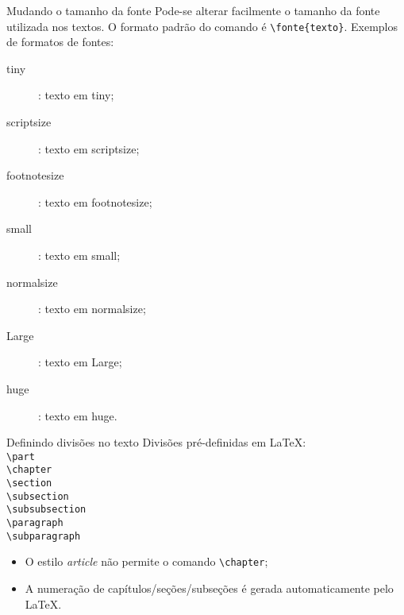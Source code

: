 \begin{frame}[fragile]{Mudando o tamanho da fonte}
Pode-se alterar facilmente o tamanho da fonte utilizada nos textos. O formato padr\~ao do comando \'e \verb|\fonte{texto}|. Exemplos de formatos de fontes:\\
\begin{description}
\item[tiny]: \tiny{texto em tiny};
\item[scriptsize]: \scriptsize{texto em scriptsize};
\item[footnotesize]: \footnotesize{texto em footnotesize}; 
\item[small]: \small{texto em small};
\item[normalsize]: \normalsize{texto em normalsize};
\item[Large]: \Large{texto em Large};
\item[huge]: \huge{texto em huge}.
\end{description}
\end{frame}


\begin{frame}[fragile]{Definindo divis\~oes no texto}
Divis\~oes pr\'e-definidas em \LaTeX:\\
\verb|\part| \\
\verb|\chapter| \\
\verb|\section| \\
\verb|\subsection|\\
\verb|\subsubsection|\\
\verb|\paragraph| \\
\verb|\subparagraph|\\

\begin{itemize}
\item O estilo \textit{article} n\~ao permite o comando \verb|\chapter|;
\item A numera{\c c}\~ao de cap\'itulos/se{\c c}\~oes/subse{\c c}\~oes \'e gerada automaticamente pelo \LaTeX.
\end{itemize}
\end{frame}
